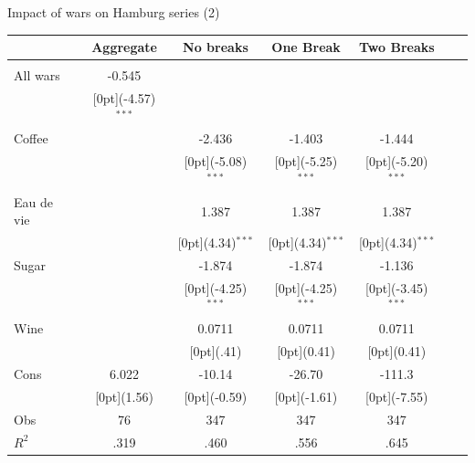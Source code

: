 \documentclass[11pt]{beamer}
\begin{document}
\begin{frame}{Impact of wars on Hamburg series (2)}
\begin{tabular*}{\textwidth}{@{\extracolsep{\fill}}lcccccc}						
	& \multicolumn{1}{c}{Aggregate} &	\multicolumn{1}{c}{No breaks} &	\multicolumn{1}{c}{One Break} & \multicolumn{1}{c}{Two Breaks} & \\
\hline					
\hline \\		
All wars &	-0.545 &	 & & & & \\
&	\raisebox{.7ex}[0pt]{\scriptsize (-4.57)$^{***}$} 	& &	& &	& \\				
Coffee &	 & -2.436 & -1.403 &	-1.444  &\\
& &	\raisebox{.7ex}[0pt]{\scriptsize (-5.08)$^{***}$} &	\raisebox{.7ex}[0pt]{\scriptsize (-5.25)$^{***}$} &	\raisebox{.7ex}[0pt]{\scriptsize (-5.20)$^{***}$} &\\
Eau de vie  & &	1.387 &1.387 &	1.387  &\\
& &	\raisebox{.7ex}[0pt]{\scriptsize (4.34)$^{***}$} &	\raisebox{.7ex}[0pt]{\scriptsize (4.34)$^{***}$} &	\raisebox{.7ex}[0pt]{\scriptsize (4.34)$^{***}$} \\
Sugar	& &	-1.874 &-1.874 &	-1.136  \\
& &	\raisebox{.7ex}[0pt]{\scriptsize (-4.25)$^{***}$} &	\raisebox{.7ex}[0pt]{\scriptsize (-4.25)$^{***}$} &	\raisebox{.7ex}[0pt]{\scriptsize (-3.45)$^{***}$} \\
Wine&	 &	0.0711 & 0.0711 &	0.0711 \\
& &	\raisebox{.7ex}[0pt]{\scriptsize (.41)} &	\raisebox{.7ex}[0pt]{\scriptsize (0.41)} &	\raisebox{.7ex}[0pt]{\scriptsize (0.41)} \\
Cons &	6.022 &	-10.14 &	-26.70  &	-111.3 \\
&	\raisebox{.7ex}[0pt]{\scriptsize (1.56)} &	\raisebox{.7ex}[0pt]{\scriptsize (-0.59)} &	\raisebox{.7ex}[0pt]{\scriptsize (-1.61)} &	\raisebox{.7ex}[0pt]{\scriptsize (-7.55)} \\
\hline 
Obs &	76 &	347 &	347  & 347 \\
$ R^2$ &	.319 &	.460 &	.556  & .645 \\

\hline\hline						
\end{tabular*}%
\end{frame}
\end{document}
